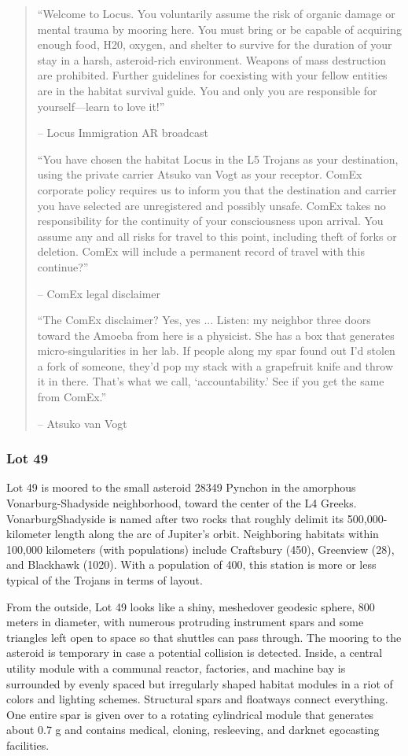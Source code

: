 \begin{quotation}
“Welcome to Locus. You voluntarily assume the risk of organic damage or mental trauma by mooring here. You must bring or be capable of acquiring enough food, H20, oxygen, and shelter to survive for the duration of your stay in a harsh, asteroid-rich environment. Weapons of mass destruction are prohibited. Further guidelines for coexisting with your fellow entities are in the habitat survival guide. You and only you are responsible for yourself—learn to love it!” 

 -- Locus Immigration AR broadcast 

 “You have chosen the habitat Locus in the L5 Trojans as your destination, using the private carrier Atsuko van Vogt as your receptor. ComEx corporate policy requires us to inform you that the destination and carrier you have selected are unregistered and possibly unsafe. ComEx takes no responsibility for the continuity of your consciousness upon arrival. You assume any and all risks for travel to this point, including theft of forks or deletion. ComEx will include a permanent record of travel with this continue?” 

 -- ComEx legal disclaimer 

 “The ComEx disclaimer? Yes, yes ... Listen: my neighbor three doors toward the Amoeba from here is a physicist. She has a box that generates micro-singularities in her lab. If people along my spar found out I’d stolen a fork of someone, they’d pop my stack with a grapefruit knife and throw it in there. That’s what we call, ‘accountability.’ See if you get the same from ComEx.” 

 -- Atsuko van Vogt
\end{quotation} 

\subsubsection{Lot 49}
\label{sec:lot-49} 

Lot 49 is moored to the small asteroid 28349 Pynchon in the amorphous Vonarburg-Shadyside neighborhood, toward the center of the L4 Greeks. VonarburgShadyside is named after two rocks that roughly delimit its 500,000-kilometer length along the arc of Jupiter's orbit. Neighboring habitats within 100,000 kilometers (with populations) include Craftsbury (450), Greenview (28), and Blackhawk (1020). With a population of 400, this station is more or less typical of the Trojans in terms of layout. 

From the outside, Lot 49 looks like a shiny, meshedover geodesic sphere, 800 meters in diameter, with numerous protruding instrument spars and some triangles left open to space so that shuttles can pass through. The mooring to the asteroid is temporary in case a potential collision is detected. Inside, a central utility module with a communal reactor, factories, and machine bay is surrounded by evenly spaced but irregularly shaped habitat modules in a riot of colors and lighting schemes. Structural spars and floatways connect everything. One entire spar is given over to a rotating cylindrical module that generates about 0.7 g and contains medical, cloning, resleeving, and darknet egocasting facilities. 


